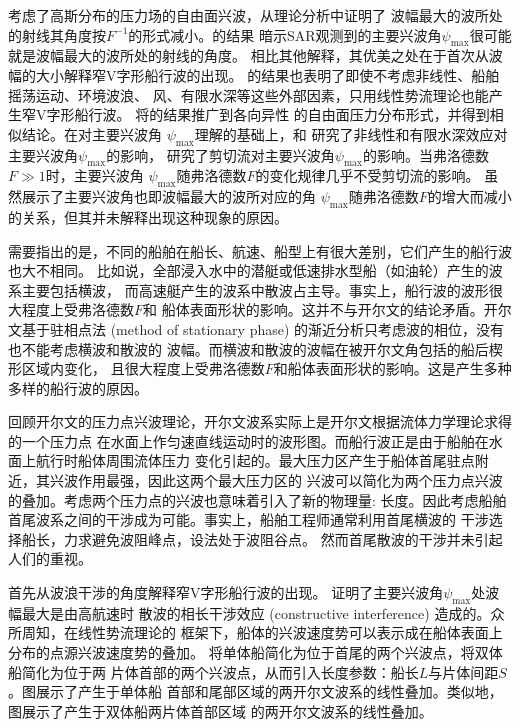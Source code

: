 \parencite{Darmon2014Kelvin}考虑了高斯分布的压力场的自由面兴波，从理论分析中证明了
波幅最大的波所处的射线其角度按$F^{-1}$的形式减小。\parencite{Darmon2014Kelvin}的结果
暗示SAR观测到的主要兴波角$\psi_{\max}$很可能就是波幅最大的波所处的射线的角度。
相比其他解释，其优美之处在于首次从波幅的大小解释窄V字形船行波的出现\supercite{Dias2014Ship}。
\parencite{Darmon2014Kelvin}的结果也表明了即使不考虑非线性、船舶摇荡运动、环境波浪、
风、有限水深等这些外部因素，只用线性势流理论也能产生窄V字形船行波。
\parencite{Benzaquen2014Wake}将\parencite{Darmon2014Kelvin}的结果推广到各向异性
的自由面压力分布形式，并得到相似结论。在\parencite{Darmon2014Kelvin}对主要兴波角
$\psi_{\max}$理解的基础上，\parencite{Pethiyagoda2014What}和\parencite{Pethiyagoda2015Wake}
研究了非线性和有限水深效应对主要兴波角$\psi_{\max}$的影响，\parencite{Ellingsen2014Ship}
研究了剪切流对主要兴波角$\psi_{\max}$的影响。当弗洛德数$F\gg1$时，主要兴波角
$\psi_{\max}$随弗洛德数$F$的变化规律几乎不受剪切流的影响。
虽然\parencite{Darmon2014Kelvin}展示了主要兴波角也即波幅最大的波所对应的角
$\psi_{\max}$随弗洛德数$F$的增大而减小的关系，但其并未解释出现这种现象的原因。


需要指出的是，不同的船舶在船长、航速、船型上有很大差别，它们产生的船行波也大不相同。
比如说，全部浸入水中的潜艇或低速排水型船（如油轮）产生的波系主要包括横波，
而高速艇产生的波系中散波占主导。事实上，船行波的波形很大程度上受弗洛德数$F$和
船体表面形状的影响。这并不与开尔文的结论矛盾。开尔文基于驻相点法
(method of stationary phase) 的渐近分析只考虑波的相位，没有也不能考虑横波和散波的
波幅。而横波和散波的波幅在被开尔文角包括的船后楔形区域内变化，
且很大程度上受弗洛德数$F$和船体表面形状的影响。这是产生多种多样的船行波的原因。

回顾开尔文的压力点兴波理论，开尔文波系实际上是开尔文根据流体力学理论求得的一个压力点
在水面上作匀速直线运动时的波形图。而船行波正是由于船舶在水面上航行时船体周围流体压力
变化引起的。最大压力区产生于船体首尾驻点附近，其兴波作用最强，因此这两个最大压力区的
兴波可以简化为两个压力点兴波的叠加。考虑两个压力点的兴波也意味着引入了新的物理量:
长度。因此考虑船舶首尾波系之间的干涉成为可能。事实上，船舶工程师通常利用首尾横波的
干涉选择船长，力求避免波阻峰点，设法处于波阻谷点\supercite{sheng2003principle}。
然而首尾散波的干涉并未引起人们的重视。

\parencite{Noblesse2014Why}首先从波浪干涉的角度解释窄V字形船行波的出现。
\parencite{Noblesse2014Why}证明了主要兴波角$\psi_{\max}$处波幅最大是由高航速时
散波的相长干涉效应 (constructive interference) 造成的。众所周知，在线性势流理论的
框架下，船体的兴波速度势可以表示成在船体表面上分布的点源兴波速度势的叠加\supercite{Noblesse2011Practical,Noblesse2013Neumann}。
\parencite{Noblesse2014Why}将单体船简化为位于首尾的两个兴波点，将双体船简化为位于两
片体首部的两个兴波点，从而引入长度参数：船长$L$与片体间距$S$。图展示了产生于单体船
首部和尾部区域的两开尔文波系的线性叠加。类似地，图展示了产生于双体船两片体首部区域
的两开尔文波系的线性叠加。

